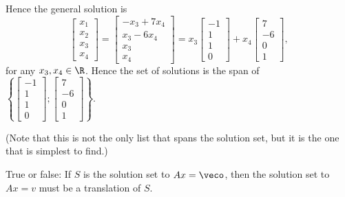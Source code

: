{Hence the general solution is \[
\left[ \begin{array}{c} x_1 \\ x_2 \\ x_3 \\ x_4 \end{array}\right] = 
\left[ \begin{array}{c} -x_3 + 7x_4 \\ x_3 - 6x_4 \\ x_3 \\ x_4 \end{array}\right] = 
x_3 \left[ \begin{array}{c} -1 \\ 1 \\ 1 \\ 0 \end{array}\right] + 
x_4 \left[ \begin{array}{c} 7 \\ - 6 \\ 0 \\ 1 \end{array}\right],
\]
for any $x_3,x_4 \in \R$.  Hence the set of solutions is the span of  
$\left\{ \left[ \begin{array}{c} -1 \\ 1 \\ 1 \\ 0 \end{array} \right]; 
\left[ \begin{array}{c} 7 \\ -6 \\ 0 \\ 1 \end{array} \right]\right\}.$

(Note that this is not the only list that spans the solution set, but it is the one that is simplest to find.)

}


\endedxproblem






     

True or false: If $S$ is the solution set to $Ax = \veco$, then the solution set to 
$Ax = v$ must be a translation of $S$.  





